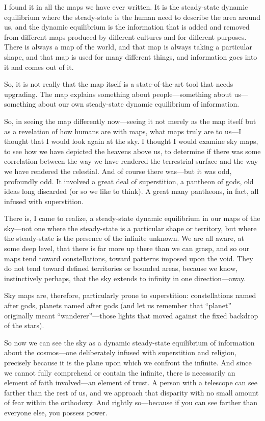 I found it in all the maps we have ever written. It is the steady-state dynamic equilibrium where the steady-state is the human need to describe the area around us, and the dynamic equilibrium is the information that is added and removed from different maps produced by different cultures and for different purposes. There is always a map of the world, and that map is always taking a particular shape, and that map is used for many different things, and information goes into it and comes out of it.

So, it is not really that the map itself is a state-of-the-art tool that needs upgrading. The map explains something about people—something about us—something about our own steady-state dynamic equilibrium of information.

So, in seeing the map differently now—seeing it not merely as the map itself but as a revelation of how humans are with maps, what maps truly are to us—I thought that I would look again at the sky. I thought I would examine sky maps, to see how we have depicted the heavens above us, to determine if there was some correlation between the way we have rendered the terrestrial surface and the way we have rendered the celestial. And of course there was—but it was odd, profoundly odd. It involved a great deal of superstition, a pantheon of gods, old ideas long discarded (or so we like to think). A great many pantheons, in fact, all infused with superstition.

There is, I came to realize, a steady-state dynamic equilibrium in our maps of the sky—not one where the steady-state is a particular shape or territory, but where the steady-state is the presence of the infinite unknown. We are all aware, at some deep level, that there is far more up there than we can grasp, and so our maps tend toward constellations, toward patterns imposed upon the void. They do not tend toward defined territories or bounded areas, because we know, instinctively perhaps, that the sky extends to infinity in one direction—away.

Sky maps are, therefore, particularly prone to superstition: constellations named after gods, planets named after gods (and let us remember that “planet” originally meant “wanderer”—those lights that moved against the fixed backdrop of the stars).

So now we can see the sky as a dynamic steady-state equilibrium of information about the cosmos—one deliberately infused with superstition and religion, precisely because it is the plane upon which we confront the infinite. And since we cannot fully comprehend or contain the infinite, there is necessarily an element of faith involved—an element of trust. A person with a telescope can see farther than the rest of us, and we approach that disparity with no small amount of fear within the orthodoxy. And rightly so—because if you can see farther than everyone else, you possess power.

